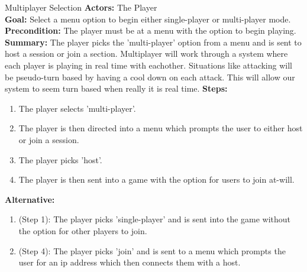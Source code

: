 \documentclass[12pt]{report}
\begin{document}
\begin{subsection}{Multiplayer Selection}
\textbf{Actors:} The Player \\
\textbf{Goal:} Select a menu option to begin either single-player or multi-player mode. \\
\textbf{Precondition:} The player must be at a menu with the option to begin playing. \\
\textbf{Summary:} The player picks the 'multi-player' option from a menu and is sent to host a session or join a section. Multiplayer will work through a system where each player is playing in real time with eachother. Situations like attacking will be pseudo-turn based by having a cool down on each attack. This will allow our system to seem turn based when really it is real time.
\textbf{Steps:}
\begin{enumerate}
	\item The player selects 'multi-player'.
	\item The player is then directed into a menu which prompts the user to either host or join a session.
	\item The player picks 'host'.
	\item The player is then sent into a game with the option for users to join at-will.
\end{enumerate}
\textbf{Alternative:}
\begin{enumerate}
	\item (Step 1): The player picks 'single-player' and is sent into the game without the option for other players to join.
	\item (Step 4): The player picks 'join' and is sent to a menu which prompts the user for an ip address which then connects them with a host.
\end{enumerate}
\end{subsection}
\end{document}
